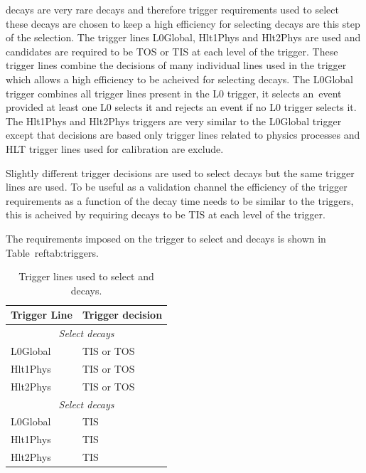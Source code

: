 \bsmumu decays are very rare decays and therefore trigger requirements used to select these decays are chosen to keep a high efficiency for selecting \bsmumu decays are this step of the selection. The trigger lines L0Global, Hlt1Phys and Hlt2Phys are used and candidates are required to be TOS or TIS at each level of the trigger. These trigger lines combine the decisions of many individual lines used in the trigger which allows a high efficiency to be acheived for selecting \bsmumu decays. The L0Global trigger combines all trigger lines present in the L0 trigger, it selects an\
 event provided at least one L0 selects it and rejects an event if no L0 trigger selects it. The Hlt1Phys and Hlt2Phys triggers are very similar to the L0Global trigger except that decisions are based only trigger lines related to physics processes and HLT trigger lines used for calibration are exclude.


Slightly different trigger decisions are used to select \bhh decays but the same trigger lines are used. To be useful as a validation channel the efficiency of the trigger requirements as a function of the decay time needs to be similar to the \bsmumu triggers, this is acheived by requiring \bhh decays to be TIS at each level of the trigger. %

The requirements imposed on the trigger to select \bsmumu and \bhh decays is shown in Table~ref{tab:triggers}.

\begin{table}[htbp]
\begin{center}
\begin{tabular}{ll}
\hline
Trigger Line	& Trigger decision \\ \hline
\multicolumn{2}{c}{{\it Select \bsmumu decays}} \\ \hline
L0Global	& TIS or TOS \\
Hlt1Phys	& TIS or TOS \\
Hlt2Phys	& TIS or TOS \\ \hline
\multicolumn{2}{c}{{\it Select \bhh decays}} \\ \hline
L0Global	& TIS\\
Hlt1Phys	& TIS \\
Hlt2Phys	& TIS \\ \hline
\end{tabular}
\vspace{0.7cm}
\caption{Trigger lines used to select \bsmumu and \bhh decays.}%
\label{tab:triggers}
\end{center}
\end{table}



